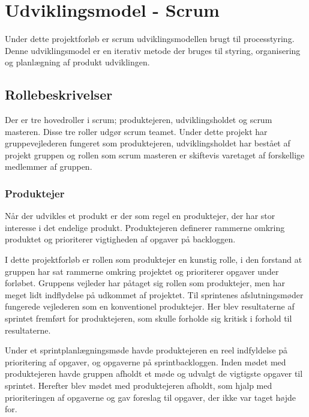 \chapter{Udviklingsmodel - Scrum}
Under dette projektforløb er scrum udviklingsmodellen brugt til processtyring. Denne udviklingsmodel er en iterativ metode der bruges til styring, organisering og planlægning af produkt udviklingen.


\section{Rollebeskrivelser}
Der er tre hovedroller i scrum; produktejeren, udviklingsholdet og scrum masteren. Disse tre roller udgør scrum teamet. Under dette projekt har gruppevejlederen fungeret som produktejeren, udviklingsholdet har bestået af projekt gruppen og rollen som scrum masteren er skiftevis varetaget af forskellige medlemmer af gruppen.

\subsection{Produktejer}
Når der udvikles et produkt er der som regel en produktejer, der har stor interesse i det endelige produkt. Produktejeren definerer rammerne omkring produktet og prioriterer vigtigheden af opgaver på backloggen. \newline

I dette projektforløb er rollen som produktejer en kunstig rolle, i den forstand at gruppen har sat rammerne omkring projektet og prioriterer opgaver under forløbet. Gruppens vejleder har påtaget sig rollen som produktejer, men har meget lidt indflydelse på udkommet af projektet. Til sprintenes afslutningsmøder fungerede vejlederen som en konventionel produktejer. Her blev resultaterne af sprintet fremført for produktejeren, som skulle forholde sig kritisk i forhold til resultaterne.

Under et sprintplanlægningsmøde havde produktejeren en reel indfyldelse på prioritering af opgaver, og opgaverne på sprintbackloggen. Inden mødet med produktejeren havde gruppen afholdt et møde og udvalgt de vigtigste opgaver til sprintet. Herefter blev mødet med produktejeren afholdt, som hjalp med prioriteringen af opgaverne og gav foreslag til opgaver, der ikke var taget højde for.  

